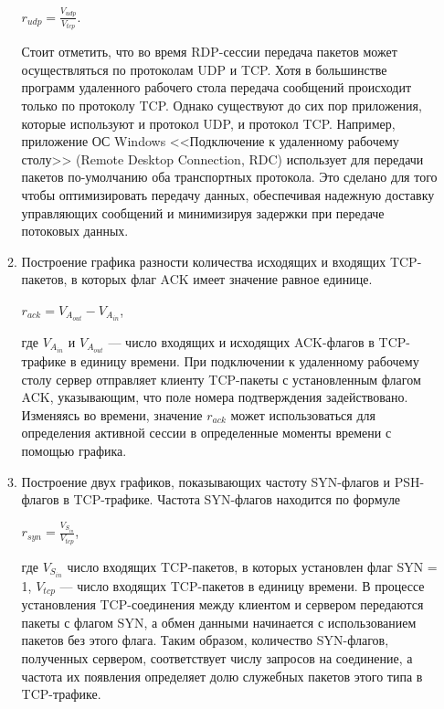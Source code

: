 \documentclass[bachelor, och, coursework]{SCWorks}
\begin{document}
\begin{enumerate}
\begin{enumerate}
    \begin{center}
      $r_{udp} = \frac{V_{udp}}{V_{tcp}}$.
    \end{center}

    Стоит отметить, что во время RDP-сессии передача пакетов может осуществляться по протоколам UDP и TCP. Хотя в большинстве программ удаленного
    рабочего стола передача сообщений происходит только по протоколу TCP. Однако существуют до сих пор приложения, которые используют и протокол
    UDP, и протокол TCP. Например, приложение ОС Windows <<Подключение к удаленному рабочему столу>> (Remote Desktop Connection, RDC) использует для
    передачи пакетов по-умолчанию оба транспортных протокола. Это сделано для того чтобы оптимизировать передачу данных, обеспечивая надежную 
    доставку управляющих сообщений и минимизируя задержки при передаче потоковых данных.
    
    \item Построение графика разности количества исходящих и входящих TCP-пакетов, в которых флаг ACK имеет значение
    равное единице.

    \begin{center}
      $r_{ack} = V_{A_{out}} - V_{A_{in}}$,
    \end{center}

    где $V_{A_{in}}$ и $V_{A_{out}}$ --- число входящих и исходящих ACK-флагов в TCP-трафике в единицу времени. При подключении к удаленному рабочему 
    столу сервер отправляет клиенту TCP-пакеты с установленным флагом ACK, указывающим, что поле номера подтверждения задействовано. Изменяясь во времени, 
    значение $r_{ack}$ может использоваться для определения активной сессии в определенные моменты времени с помощью графика.

    \item Построение двух графиков, показывающих частоту SYN-флагов и PSH-флагов в TCP-трафике. Частота SYN-флагов находится по формуле
    
    \begin{center}
      $r_{syn} = \frac{V_{S_{in}}}{V_{tcp}}$,
    \end{center}

    где $V_{S_{in}}$ число входящих TCP-пакетов, в которых установлен флаг SYN = 1, $V_{tcp}$ --- число входящих TCP-пакетов в единицу времени.
    В процессе установления TCP-соединения между клиентом и сервером передаются пакеты с флагом SYN, а обмен данными начинается с 
    использованием пакетов без этого флага. Таким образом, количество SYN-флагов, полученных сервером, соответствует числу запросов 
    на соединение, а частота их появления определяет долю служебных пакетов этого типа в TCP-трафике.


\end{enumerate}
\end{enumerate}
\end{document}
